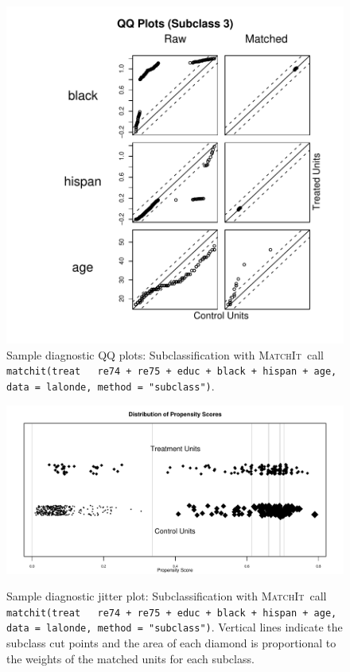 \documentclass[oneside,letterpaper,titlepage]{article}
\newcommand{\MatchIt}{\textsc{MatchIt}}
\begin{document}
\begin{enumerate}
\begin{figure}[tbp]
\begin{center}
    \includegraphics[scale=.5]{figs/qqplotsub2}
    \hfill
    \caption{Sample diagnostic QQ plots: Subclassification with
      \MatchIt\ call \texttt{matchit(treat ~ re74 + re75 + educ +
        black + hispan + age, data = lalonde, method = "subclass")}.}
\label{diagqqsub}
\end{center}
\end{figure}

\begin{figure}[tbp]
  \begin{center}
    {\includegraphics[scale=0.7]{figs/jitterplotsub}}
    \hfill
    \caption{Sample diagnostic jitter plot: Subclassification with
      \MatchIt\ call \texttt{matchit(treat ~ re74 + re75 + educ +
        black + hispan + age, data = lalonde, method = "subclass")}.
      Vertical lines indicate the subclass cut points and the area of
      each diamond is proportional to the weights of the matched units
      for each subclass.}
\label{diagjittersub}
\end{center}
\end{figure}


\end{enumerate}
\end{document}
